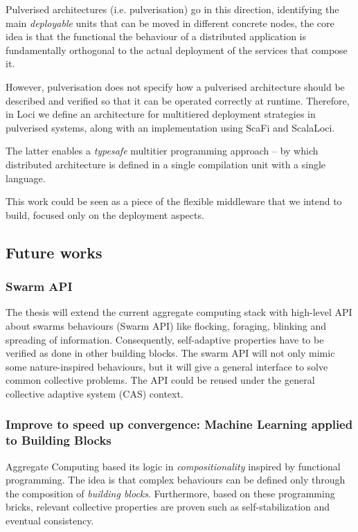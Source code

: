 \documentclass[11pt]{article}
\begin{document}
Pulverised architectures (i.e. pulverisation) go in this direction, identifying the main \textit{deployable} units that can be moved in different concrete nodes, the core idea is that the functional
the behaviour of a distributed application is fundamentally orthogonal to the actual deployment of the services that compose it.

However, pulverisation does not specify how a pulverised architecture should
be described and verified so that it can be operated correctly
at runtime.
Therefore, in \scafiweb Loci we define an architecture for multitiered deployment strategies in pulverised systems, along with an implementation using ScaFi and ScalaLoci.

The latter enables a \textit{typesafe} multitier programming approach -- by which distributed architecture is defined
in a single compilation unit with a single language.

This work could be seen as a piece of the flexible middleware that we intend to build, focused only on the deployment aspects.

\subsection{Future works}

\subsubsection{Swarm API}
The thesis will extend the current aggregate computing stack with high-level API about swarms behaviours (Swarm API) like flocking, foraging, blinking and spreading of information.  Consequently, self-adaptive properties have to be verified as done in other building blocks.  The swarm API will not only mimic some nature-inspired behaviours, but it will give a general interface to solve common collective problems. The API could be reused under the general collective adaptive system (CAS) context.
\subsubsection{Improve to speed up convergence: Machine Learning applied to Building Blocks}
Aggregate Computing based its logic in \textit{compositionality} inspired by functional programming. The idea is that complex behaviours can be defined only through the composition of \emph{building blocks}. Furthermore, based on these programming bricks, relevant collective properties are proven such as self-stabilization and eventual consistency. 
\end{document}
